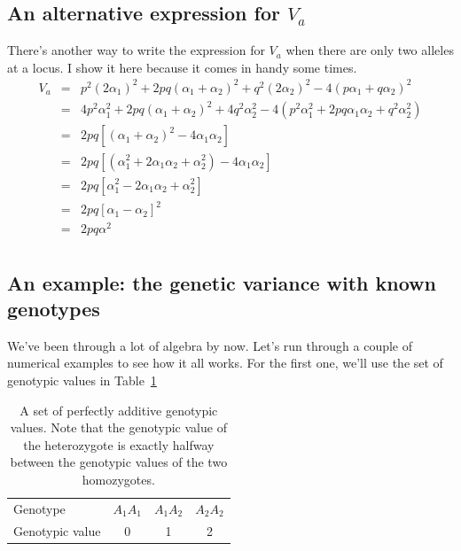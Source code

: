 \subsection*{An alternative expression for $V_a$}

There's another way to write the expression for $V_a$ when there are
only two alleles at a locus. I show it here because it comes in handy
some times.
\begin{eqnarray*}
V_a &=& p^2(2\alpha_1)^2 + 2pq(\alpha_1+\alpha_2)^2 + q^2(2\alpha_2)^2 -
        4(p\alpha_1+q\alpha_2)^2 \\
    &=& 4p^2\alpha_1^2 + 2pq(\alpha_1+\alpha_2)^2 + 4q^2\alpha_2^2
       - 4(p^2\alpha_1^2 +2pq\alpha_1\alpha_2 + q^2\alpha_2^2) \\
    &=& 2pq[(\alpha_1+\alpha_2)^2 - 4\alpha_1\alpha_2] \\
    &=& 2pq[(\alpha_1^2 + 2\alpha_1\alpha_2 + \alpha_2^2) - 4\alpha_1\alpha_2] \\
    &=& 2pq[\alpha_1^2 - 2\alpha_1\alpha_2 + \alpha_2^2] \\
    &=& 2pq[\alpha_1 - \alpha_2]^2 \\
    &=& 2pq\alpha^2 \\
\end{eqnarray*}

\subsection*{An example: the genetic variance with known genotypes}

We've been through a lot of algebra by now. Let's run through a couple
of numerical examples to see how it all works. For the first one,
we'll use the set of genotypic values in Table~\ref{table:additive}

\begin{table}
\begin{center}
\begin{tabular}{l|ccc}
\hline\hline
Genotype        & $A_1A_1$ & $A_1A_2$ & $A_2A_2$ \\
Genotypic value &  0       & 1        & 2 \\
\hline
\end{tabular}
\end{center}
\caption{A set of perfectly additive genotypic values. Note that the
  genotypic value of the heterozygote is exactly halfway between the
  genotypic values of the two homozygotes.}\label{table:additive}
\end{table}

